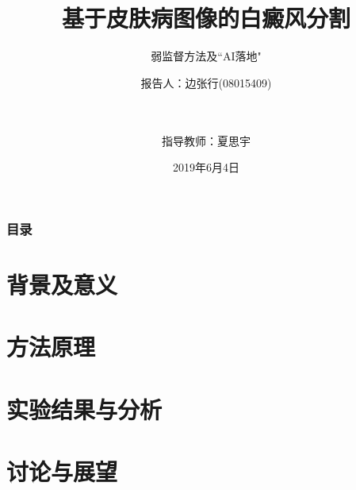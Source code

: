 \documentclass[UTF8]{ctexbeamer}
\title[Vitiligo Segmentation] %
{基于皮肤病图像的白癜风分割}
\subtitle{弱监督方法及``AI落地"}
\author[边张行 08015409] %
{报告人：边张行(08015409) \and \\~\\指导教师：夏思宇}
\institute[SEU] %
{
\normalsize 东南大学自动化学院, 南京
}
\date[June 4, 2019] %
{2019年6月4日 }
\begin{document}
 
\frame{\titlepage}
 \begin{frame}
\frametitle{目录}
\tableofcontents
\end{frame}

\section{背景及意义}




\section{方法原理}


\section{实验结果与分析}


\section{讨论与展望}



%
%
\end{document}

